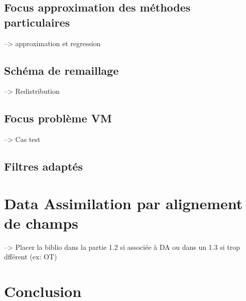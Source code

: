 \documentclass{article}
\begin{document}
\subsection{Focus approximation des méthodes particulaires}
--> approximation et regression

\subsection{Schéma de remaillage}
--> Redistribution

\subsection{Focus problème VM}
--> Cas test

\subsection{Filtres adaptés}

\section{Data Assimilation par alignement de champs}
--> Placer la biblio dans la partie 1.2 si associée à DA ou dans un 1.3 si trop dfférent (ex: OT)

\section{Conclusion}
\end{document}

